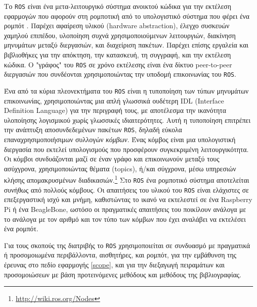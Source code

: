Το \texttt{ROS} είναι ένα μετα-λειτουργικό σύστημα ανοικτού κώδικα για την
εκτέλεση εφαρμογών που αφορούν στη ρομποτική από το υπολογιστικό σύστημα που
φέρει ένα ρομπότ \cite{Ng2009}. Παρέχει αφαίρεση υλικού (hardware abstraction),
έλεγχο συσκευών χαμηλού επιπέδου, υλοποίηση συχνά χρησιμοποιούμενων
λειτουργιών, διακίνηση μηνυμάτων μεταξύ διεργασιών, και διαχείριση πακέτων.
Παρέχει επίσης εργαλεία και βιβλιοθήκες για την απόκτηση, την κατασκευή, τη
συγγραφή, και την εκτέλεση κώδικα. Ο "γράφος" του \texttt{ROS} σε χρόνο
εκτέλεσης είναι ένα δίκτυο peer-to-peer διεργασιών που συνδέονται
χρησιμοποιώντας την υποδομή επικοινωνίας του \texttt{ROS}.

Ένα από τα κύρια πλεονεκτήματα του \texttt{ROS} είναι η τυποποίηση των τύπων
μηνυμάτων επικοινωνίας, χρησιμοποιώντας μια απλή γλωσσικά ουδέτερη IDL
(Interface Definition Language) για την περιγραφή τους, με αποτέλεσμα την
ικανότητα υλοποίησης λογισμικού χωρίς γλωσσικές ιδιαιτερότητες. Αυτή η
τυποποίηση επιτρέπει την ανάπτυξη αποσυνδεδεμένων πακέτων \texttt{ROS}, δηλαδή
εύκολα επαναχρησιμοποιήσιμων συλλογών \textit{κόμβων}. Ένας κόμβος είναι μια
υπολογιστική διεργασία που εκτελεί υπολογισμούς που προσφέρουν συγκεκριμένη
λειτουργικότητα. Οι κόμβοι συνδυάζονται μαζί σε έναν γράφο και επικοινωνούν
μεταξύ τους ασύχγρονα, χρησιμοποιώντας θέματα (topics), ή/και σύγχρονα, μέσω
υπηρεσιών κλήσης απομακρυσμένων
διαδικασιών.\footnote{\url{http://wiki.ros.org/Nodes}} Στο \texttt{ROS} ένα
ρομποτικό σύστημα αποτελείται συνήθως από πολλούς κόμβους.  Οι απαιτήσεις του
υλικού του \texttt{ROS} είναι ελάχιστες σε επεξεργαστική ισχύ και μνήμη,
καθιστώντας το ικανό να εκτελεστεί σε ένα Raspberry Pi ή ένα BeagleBone, ωστόσο
οι πραγματικές απαιτήσεις του ποικίλουν ανάλογα με το ανάλογα με τον αριθμό και
τον τύπο των κόμβων που έχει αναλάβει να εκτελέσει ένα ρομπότ.

Για τους σκοπούς της διατριβής το \texttt{ROS} χρησιμοποιείται σε συνδυασμό με
πραγματικά ή προσομοιωμένα περιβάλλοντα, αισθητήρες, και ρομπότ, για την
εμβάθυνση της έρευνας στο πεδίο εφαρμογής \ref{scope}, και για την διεξαγωγή
πειραμάτων και προσομοιώσεων με βάση προτεινόμενες μεθόδους και μεθόδους της
βιβλιογραφίας.
